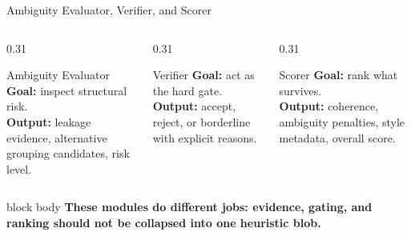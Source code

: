 \documentclass[11pt,aspectratio=169]{beamer}
\newcommand{\KeyMessage}[1]{%
  \begin{beamercolorbox}[wd=\linewidth,rounded=true,sep=8pt]{block body}
    \centering\bfseries #1
  \end{beamercolorbox}
}
\begin{document}
\begin{frame}{Ambiguity Evaluator, Verifier, and Scorer}
  \begin{columns}[T,onlytextwidth]
    \begin{column}{0.31\textwidth}
      \begin{block}{Ambiguity Evaluator}
        \textbf{Goal:} inspect structural risk.\\[4pt]
        \textbf{Output:} leakage evidence, alternative grouping candidates, risk level.
      \end{block}
    \end{column}
    \begin{column}{0.31\textwidth}
      \begin{alertblock}{Verifier}
        \textbf{Goal:} act as the hard gate.\\[4pt]
        \textbf{Output:} accept, reject, or borderline with explicit reasons.
      \end{alertblock}
    \end{column}
    \begin{column}{0.31\textwidth}
      \begin{exampleblock}{Scorer}
        \textbf{Goal:} rank what survives.\\[4pt]
        \textbf{Output:} coherence, ambiguity penalties, style metadata, overall score.
      \end{exampleblock}
    \end{column}
  \end{columns}

  \vspace{0.2cm}
  \KeyMessage{These modules do different jobs: evidence, gating, and ranking should not be collapsed into one heuristic blob.}
\end{frame}
\end{document}
